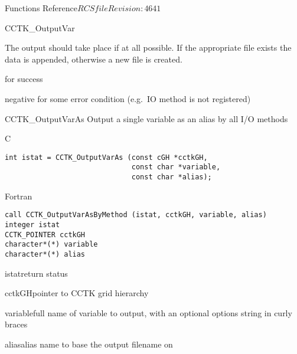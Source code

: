 \begin{cactuspart}{ Functions Reference}{$RCSfile$}{$Revision: 4641 $}
\begin{FunctionDescription}{CCTK\_OutputVar}
\begin{Discussion}
The output should take place if at all possible.
If the appropriate file exists the data is appended, otherwise a new
file is created.
\end{Discussion}

\begin{ErrorSection}
\begin{Error}{0}
for success
\end{Error}
\begin{Error}{negative}
for some error condition (e.g.\ IO method is not registered)
\end{Error}
\end{ErrorSection}
\end{FunctionDescription}


\begin{FunctionDescription}{CCTK\_OutputVarAs}
Output a single variable as an alias by all I/O methods
\label{CCTK-OutputVarAs}

\begin{SynopsisSection}
\begin{Synopsis}{C}
\begin{verbatim}
int istat = CCTK_OutputVarAs (const cGH *cctkGH,
                              const char *variable,
                              const char *alias);
\end{verbatim}
\end{Synopsis}
\begin{Synopsis}{Fortran}
\begin{verbatim}
call CCTK_OutputVarAsByMethod (istat, cctkGH, variable, alias)
integer istat
CCTK_POINTER cctkGH
character*(*) variable
character*(*) alias
\end{verbatim}
\end{Synopsis}
\end{SynopsisSection}

\begin{ParameterSection}
\begin{Parameter}{istat}return status\end{Parameter}
\begin{Parameter}{cctkGH}pointer to CCTK grid hierarchy\end{Parameter}
\begin{Parameter}{variable}full name of variable to output, with an optional
options string in curly braces\end{Parameter}
\begin{Parameter}{alias}alias name to base the output filename on\end{Parameter}
\end{ParameterSection}


\end{FunctionDescription}
\end{cactuspart}
